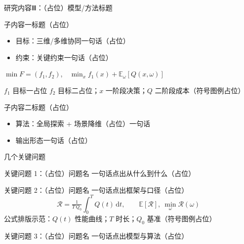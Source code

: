 \documentclass[aspectratio=169,11pt]{beamer}
\begin{document}
\begin{frame}{研究内容Ⅲ：（占位）模型/方法标题}
  \small
  \begin{point}{子内容一标题（占位）}
    \begin{itemize}
      \item \textcolor{primary}{目标}：三维/多维协同一句话（占位）
      \item \textcolor{primary}{约束}：关键约束一句话（占位）
    \end{itemize}
    \vskip0.6mm
    $\min F=(f_1,f_2)$,\ \ $\min_x f_1(x)+\mathbb{E}_\omega[Q(x,\omega)]$\par
    {\scriptsize\color{muted} $f_1$ 目标一占位 $f_2$ 目标二占位；$x$ 一阶段决策；$Q$ 二阶段成本（符号图例占位）}
  \end{point}
  \begin{point}{子内容二标题（占位）}
    \begin{itemize}
      \item \textcolor{primary}{算法}：全局探索 + 场景降维（占位）一句话
      \item 输出形态一句话（占位）
    \end{itemize}
  \end{point}
\end{frame}

\begin{frame}{几个关键问题}
  \small
  \begin{point}{关键问题 1：（占位）问题名}
    一句话点出从什么到什么（占位）
  \end{point}
  \begin{point}{关键问题 2：（占位）问题名}
    一句话点出框架与口径（占位）
    \[ \mathcal{R}=\tfrac{1}{T\,Q_0}\textstyle\int_0^{T}\! Q(t)\,\mathrm{d}t,\qquad \mathbb{E}[\mathcal{R}],\ \min_\omega \mathcal{R}(\omega) \]
    {\scriptsize\color{muted} 公式排版示范：$Q(t)$ 性能曲线；$T$ 时长；$Q_0$ 基准（符号图例占位）}
  \end{point}
  \begin{point}{关键问题 3：（占位）问题名}
    一句话点出模型与算法（占位）
  \end{point}
\end{frame}
\end{document}
